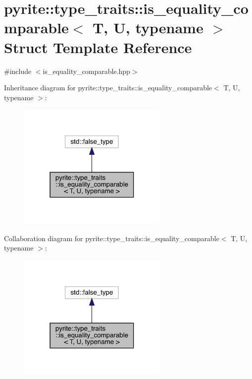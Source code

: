 \hypertarget{structpyrite_1_1type__traits_1_1is__equality__comparable}{}\section{pyrite\+:\+:type\+\_\+traits\+:\+:is\+\_\+equality\+\_\+comparable$<$ T, U, typename $>$ Struct Template Reference}
\label{structpyrite_1_1type__traits_1_1is__equality__comparable}


{\ttfamily \#include $<$is\+\_\+equality\+\_\+comparable.\+hpp$>$}



Inheritance diagram for pyrite\+:\+:type\+\_\+traits\+:\+:is\+\_\+equality\+\_\+comparable$<$ T, U, typename $>$\+:
\nopagebreak
\begin{figure}[H]
\begin{center}
\leavevmode
\includegraphics[width=207pt]{d1/da5/structpyrite_1_1type__traits_1_1is__equality__comparable__inherit__graph}
\end{center}
\end{figure}


Collaboration diagram for pyrite\+:\+:type\+\_\+traits\+:\+:is\+\_\+equality\+\_\+comparable$<$ T, U, typename $>$\+:
\nopagebreak
\begin{figure}[H]
\begin{center}
\leavevmode
\includegraphics[width=207pt]{db/d38/structpyrite_1_1type__traits_1_1is__equality__comparable__coll__graph}
\end{center}
\end{figure}


